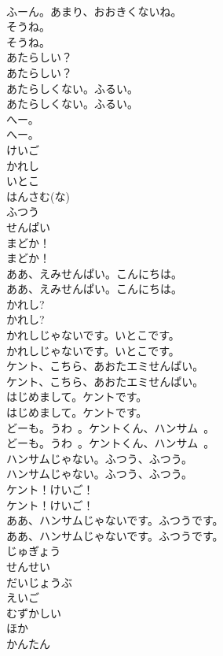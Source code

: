 \documentclass[8pt]{extreport}
\begin{document}
\begin{CJK}{UTF8}{min}
\\	ふーん。あまり、おおきくないね。 
\\	そうね。	
\\	そうね。 
\\	あたらしい？	
\\	あたらしい？ 
\\	あたらしくない。ふるい。	
\\	あたらしくない。ふるい。 
\\	へー。	
\\	へー。 
\\	けいご
\\	かれし
\\	いとこ
\\	はんさむ(な)
\\	ふつう
\\	せんぱい
\\	まどか！	
\\	まどか！ 
\\	ああ、えみせんぱい。こんにちは。	
\\	ああ、えみせんぱい。こんにちは。 
\\	かれし?	
\\	かれし? 
\\	かれしじゃないです。いとこです。	
\\	かれしじゃないです。いとこです。 
\\	ケント、こちら、あおたエミせんぱい。	
\\	ケント、こちら、あおたエミせんぱい。 
\\	はじめまして。ケントです。	
\\	はじめまして。ケントです。 
\\	どーも。うわ~。ケントくん、ハンサム~。	
\\	どーも。うわ~。ケントくん、ハンサム~。 
\\	ハンサムじゃない。ふつう、ふつう。	
\\	ハンサムじゃない。ふつう、ふつう。 
\\	ケント！けいご！	
\\	ケント！けいご！ 
\\	ああ、ハンサムじゃないです。ふつうです。	
\\	ああ、ハンサムじゃないです。ふつうです。 
\\	じゅぎょう
\\	せんせい
\\	だいじょうぶ
\\	えいご
\\	むずかしい
\\	ほか
\\	かんたん

\end{CJK}
\end{document}

